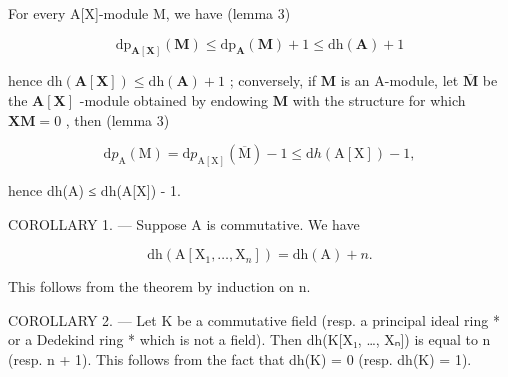 For every A{[}X{]}-module M, we have (lemma 3)

\[
\mathrm{dp} _ {\mathbf {A} [ \mathbf {X} ]} (\mathbf {M}) \leqslant \mathrm{dp} _ {\mathbf {A}} (\mathbf {M}) + 1 \leqslant \mathrm{dh} (\mathbf {A}) + 1
\]

hence \(\mathrm{dh}(\mathbf{A}[\mathbf{X}]) \leqslant \mathrm{dh}(\mathbf{A}) + 1\) ; conversely, if \(\mathbf{M}\) is an A-module, let \(\overline{\mathbf{M}}\) be the \(\mathbf{A}[\mathbf{X}]\) -module obtained by endowing \(\mathbf{M}\) with the structure for which \(\mathbf{X}\mathbf{M} = 0\) , then (lemma 3)

\[
\mathrm{d} p _ {\mathrm{A}} (\mathrm{M}) = \mathrm{d} p _ {\mathrm{A} [ \mathrm{X} ]} (\overline {{\mathrm{M}}}) - 1 \leqslant \mathrm{d} h (\mathrm{A} [ \mathrm{X} ]) - 1,
\]

hence dh(A) ≤ dh(A{[}X{]}) - 1.

COROLLARY 1. --- Suppose A is commutative. We have

\[
\mathrm{dh} (\mathrm{A} [ \mathrm{X} _ {1}, \dots , \mathrm{X} _ {n} ]) = \mathrm{dh} (\mathrm{A}) + n.
\]

This follows from the theorem by induction on n.

COROLLARY 2. --- Let K be a commutative field (resp. a principal ideal ring * or a Dedekind ring * which is not a field). Then dh(K{[}X₁, \ldots, Xₙ{]}) is equal to n (resp. n + 1). This follows from the fact that dh(K) = 0 (resp. dh(K) = 1).

